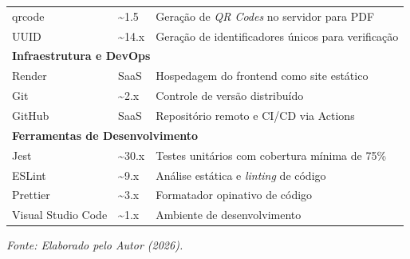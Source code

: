 \begin{quadro}[H]
\begin{tabular}{@{}lll@{}}
qrcode & \textasciitilde 1.5 & Geração de \textit{QR Codes} no servidor para PDF \\
UUID & \textasciitilde 14.x & Geração de identificadores únicos para verificação \\
\midrule
\multicolumn{3}{l}{\textbf{Infraestrutura e DevOps}} \\
Render & SaaS & Hospedagem do frontend como site estático \\
Git & \textasciitilde 2.x & Controle de versão distribuído \\
GitHub & SaaS & Repositório remoto e CI/CD via Actions \\
\midrule
\multicolumn{3}{l}{\textbf{Ferramentas de Desenvolvimento}} \\
Jest & \textasciitilde 30.x & Testes unitários com cobertura mínima de 75\% \\
ESLint & \textasciitilde 9.x & Análise estática e \textit{linting} de código \\
Prettier & \textasciitilde 3.x & Formatador opinativo de código \\
Visual Studio Code & \textasciitilde 1.x & Ambiente de desenvolvimento \\
\bottomrule
\end{tabular}
\par\vspace{0.5em}
    \parbox{\textwidth}{\raggedright\small\textit{Fonte: Elaborado pelo Autor (2026).}}
\end{quadro}
